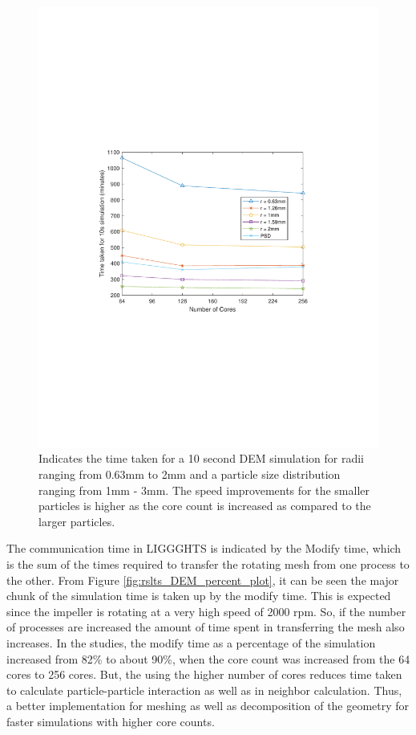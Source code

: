 \documentclass[preprint,11pt,authoryear]{elsarticle}
\begin{document}
\begin{figure}
\centering
\includegraphics[scale=0.85]{rslsts_DEM_alldia_timing_mtlb.pdf}
\caption{ Indicates the time taken for a 10 second DEM simulation for radii ranging from
 0.63mm to 2mm and a particle size distribution ranging from 1mm - 3mm. The speed improvements 
 for the smaller particles is higher as the core count is increased as compared to the larger particles.}
\label{fig:rslts_DEM_timing_studies}
\end{figure}
 The communication time in LIGGGHTS is indicated by the Modify time, which is the sum of the 
times required to transfer the rotating mesh from one process to the other. From Figure 
\ref{fig:rslts_DEM_percent_plot}, it can be seen the major chunk of the simulation time is taken up by 
the modify time. This is expected since the impeller is rotating at a very high speed of 2000 rpm. So, if 
the number of processes are increased the amount of time spent in transferring the mesh also 
increases. In the studies, the modify time as a percentage of the simulation increased from 82\% to 
about 90\%, when the core count was increased from the 64 cores to 256 cores. But, the using the 
higher number of cores reduces time taken to calculate particle-particle interaction as well as in 
neighbor calculation. Thus, a better implementation for meshing as well as decomposition of the 
geometry for faster simulations with higher core counts.
\end{document}

